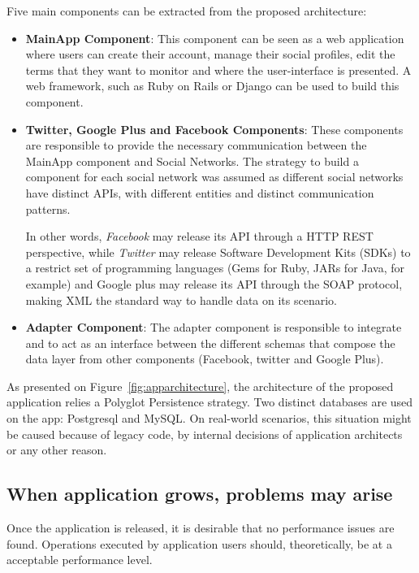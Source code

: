 Five main components can be extracted from the proposed architecture: 

\begin{itemize}
\item{
\textbf{MainApp Component}: This component can be seen as a web application where users can create their account, manage their social profiles, edit the terms that they want to monitor and where the user-interface is presented. A web framework, such as Ruby on Rails or Django can be used to build this component. 
}

\item{
\textbf{Twitter, Google Plus and Facebook Components}: These components are responsible to provide the necessary communication between the MainApp component and Social Networks. The strategy to build a component for each social network was assumed as different social networks have distinct APIs, with different entities and distinct communication patterns.

In other words, \textit{Facebook} may release its API through a HTTP REST perspective, while \textit{Twitter} may release Software Development Kits (SDKs) to a restrict set of programming languages (Gems for Ruby, JARs for Java, for example) and Google plus may release its API through the SOAP protocol, making XML the standard way to handle data on its scenario.   
}
\item{

\textbf{Adapter Component}: The adapter component is responsible to integrate and to act as an interface between the different schemas that compose the data layer from other components (Facebook, twitter and Google Plus).

}
\end{itemize}

As presented on Figure~\ref{fig:apparchitecture}, the architecture of the proposed application relies a Polyglot Persistence strategy. Two distinct databases are used on the app: Postgresql and MySQL. On real-world scenarios, this situation might be caused because of legacy code, by internal decisions of application architects or any other reason.


\subsection{When application grows, problems may arise}
\label{shithappens}

Once the application is released, it is desirable that no performance issues are found. Operations executed by application users should, theoretically, be at a acceptable performance level.

